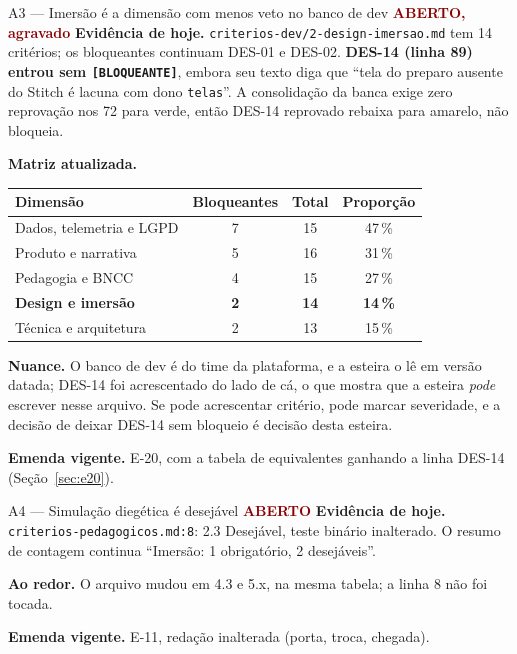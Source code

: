 \documentclass[11pt,a4paper]{article}
\newcommand{\aberto}{\textcolor{DarkRed}{\textbf{ABERTO}}}
\newcommand{\agravado}{\textcolor{DarkRed}{\textbf{ABERTO, agravado}}}
\begin{document}
\begin{achadobox}{A3 --- Imersão é a dimensão com menos veto no banco de dev \hfill \agravado}
\textbf{Evidência de hoje.} \texttt{criterios-dev/2-design-imersao.md} tem 14 critérios; os
bloqueantes continuam DES-01 e DES-02. \textbf{DES-14 (linha 89) entrou sem \texttt{[BLOQUEANTE]}},
embora seu texto diga que ``tela do preparo ausente do Stitch é lacuna com dono \texttt{telas}''. A
consolidação da banca exige zero reprovação nos 72 para verde, então DES-14 reprovado rebaixa para
amarelo, não bloqueia.

\textbf{Matriz atualizada.}
\begin{center}\small
\begin{tabular}{@{}l c c c@{}}
\toprule
\textbf{Dimensão} & \textbf{Bloqueantes} & \textbf{Total} & \textbf{Proporção} \\
\midrule
Dados, telemetria e LGPD & 7 & 15 & 47\,\% \\
Produto e narrativa & 5 & 16 & 31\,\% \\
Pedagogia e BNCC & 4 & 15 & 27\,\% \\
\textbf{Design e imersão} & \textbf{2} & \textbf{14} & \textbf{14\,\%} \\
Técnica e arquitetura & 2 & 13 & 15\,\% \\
\bottomrule
\end{tabular}
\end{center}

\textbf{Nuance.} O banco de dev é do time da plataforma, e a esteira o lê em versão datada; DES-14
foi acrescentado do lado de cá, o que mostra que a esteira \emph{pode} escrever nesse arquivo. Se
pode acrescentar critério, pode marcar severidade, e a decisão de deixar DES-14 sem bloqueio é
decisão desta esteira.

\textbf{Emenda vigente.} E-20, com a tabela de equivalentes ganhando a linha DES-14
(Seção~\ref{sec:e20}).
\end{achadobox}

\begin{achadobox}{A4 --- Simulação diegética é desejável \hfill \aberto}
\textbf{Evidência de hoje.} \texttt{criterios-pedagogicos.md:8}: 2.3 Desejável, teste binário
inalterado. O resumo de contagem continua ``Imersão: 1 obrigatório, 2 desejáveis''.

\textbf{Ao redor.} O arquivo mudou em 4.3 e 5.x, na mesma tabela; a linha 8 não foi tocada.

\textbf{Emenda vigente.} E-11, redação inalterada (porta, troca, chegada).
\end{achadobox}
\end{document}
